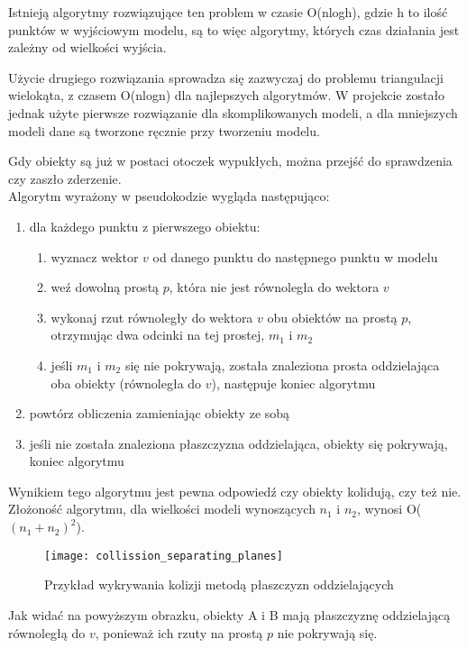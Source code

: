 Istnieją algorytmy rozwiązujące ten problem w czasie O(nlogh), gdzie h to ilo\'sć punktów w wyj\'sciowym modelu, są to więc algorytmy, których czas działania jest zależny od wielko\'sci wyj\'scia.\bigskip

Użycie drugiego rozwiązania sprowadza się zazwyczaj do problemu triangulacji wielokąta, z czasem O(nlogn) dla najlepszych algorytmów. W projekcie zostało jednak użyte pierwsze rozwiązanie dla skomplikowanych modeli, a dla mniejszych modeli dane są tworzone ręcznie przy tworzeniu modelu.\bigskip

\smallskip

\noindent Gdy obiekty są już w postaci otoczek wypukłych, można przej\'sć do sprawdzenia czy zaszło zderzenie.\\
Algorytm wyrażony w pseudokodzie wygląda następująco:\begin{enumerate}
	\item dla każdego punktu z pierwszego obiektu:\begin{enumerate}
		\item wyznacz wektor $v$ od danego punktu do następnego punktu w modelu
		\item weź dowolną prostą $p$, która nie jest równoległa do wektora $v$
		\item wykonaj rzut równoległy do wektora $v$ obu obiektów na prostą $p$, otrzymując dwa odcinki na tej prostej, $m_1$ i $m_2$
		\item je\'sli $m_1$ i $m_2$ się nie pokrywają, została znaleziona prosta oddzielająca oba obiekty (równoległa do $v$), następuje koniec algorytmu
	\end{enumerate}
	\item powtórz obliczenia zamieniając obiekty ze sobą
	\item je\'sli nie została znaleziona płaszczyzna oddzielająca, obiekty się pokrywają, koniec algorytmu
\end{enumerate}\bigskip

\noindent Wynikiem tego algorytmu jest pewna odpowiedź czy obiekty kolidują, czy też nie.\\
Złożono\'sć algorytmu, dla wielko\'sci modeli wynoszących $n_1$ i $n_2$, wynosi O($(n_1+n_2)^2$).\newpage

\begin{figure}[h]
	\centering
	\noindent\texttt{[image: collission\_separating\_planes]}
	\caption{Przykład wykrywania kolizji metodą płaszczyzn oddzielających}
	\label{separating_planes}
\end{figure}

Jak widać na powyższym obrazku, obiekty A i B mają płaszczyznę oddzielającą równoległą do $v$, ponieważ ich rzuty na prostą $p$ nie pokrywają się.
